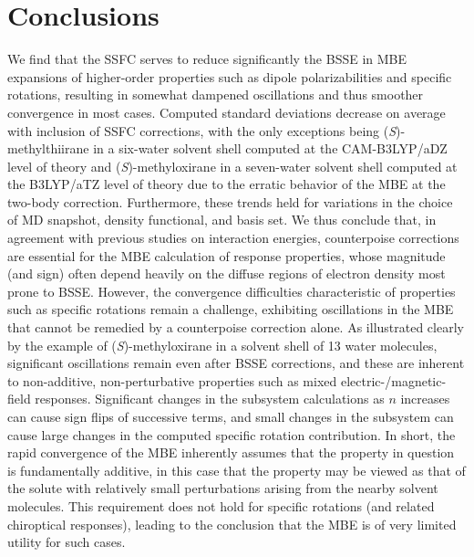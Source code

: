 \section{Conclusions} \label{se:concp1}
We find that the SSFC serves to reduce significantly the BSSE in MBE expansions of higher-order properties such as dipole polarizabilities and specific rotations, resulting in somewhat dampened oscillations and thus smoother convergence in most cases.  Computed standard deviations decrease on average with inclusion of SSFC corrections, with the only exceptions being (\textit{S})-methylthiirane in a six-water solvent shell computed at the CAM-B3LYP/aDZ level of theory and (\textit{S})-methyloxirane in a seven-water solvent shell computed at the B3LYP/aTZ level of theory due to the erratic behavior of the MBE at the two-body correction.  Furthermore, these trends held for variations in the choice of MD snapshot, density functional, and basis set.  We thus conclude that, in agreement with previous studies on interaction energies,\cite{Ouyang2014,Liu2017a,Richard2018a} counterpoise corrections are essential for the MBE calculation of response properties, whose magnitude (and sign) often depend heavily on the diffuse regions of electron density most prone to BSSE.  However, the convergence difficulties characteristic of properties such as specific rotations remain a challenge, exhibiting oscillations in the MBE that cannot be remedied by a counterpoise correction alone.  As illustrated clearly by the example of (\textit{S})-methyloxirane in a solvent shell of 13 water molecules, significant oscillations remain even after BSSE corrections, and these are inherent to non-additive, non-perturbative properties such as mixed electric-/magnetic-field responses.  Significant changes in the subsystem calculations as $n$ increases can cause sign flips of successive terms, and small changes in the subsystem can cause large changes in the computed specific rotation contribution.  In short, the rapid convergence of the MBE inherently assumes that the property in question is fundamentally additive, in this case that the property may be viewed as that of the solute with relatively small perturbations arising from the nearby solvent molecules.  This requirement does not hold for specific rotations (and related chiroptical responses), leading to the conclusion that the MBE is of very limited utility for such cases.
